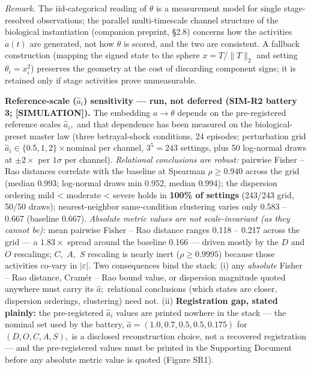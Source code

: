 \documentclass[11pt,twocolumn]{article}
\theoremstyle{gttdef}
\theoremstyle{gttplain}
\begin{document}
\emph{Remark.} The iid-categorical reading of $\theta$ is a measurement model for single stage-resolved observations; the parallel multi-timescale channel structure of the biological instantiation (companion preprint, \S{}2.8) concerns how the activities $a(t)$ are generated, not how $\theta$ is scored, and the two are consistent. A fallback construction (mapping the signed state to the sphere $x = T/\| T\|_{2}$ and setting $\theta_i = x_i^{2}$) preserves the geometry at the cost of discarding component signs; it is retained only if stage activities prove unmeasurable.

\textbf{Reference-scale ($\hat{a}_i$) sensitivity --- run, not deferred (SIM-R2 battery 3; [SIMULATION]).} The embedding $a \to \theta$ depends on the pre-registered reference scales $\hat{a}_i,$ and that dependence has been measured on the biological-preset master law (three betrayal-shock conditions, 24 episodes; perturbation grid $\hat{a}_i \in \{0.5, 1, 2\}\times$nominal per channel, $3^{5} = 243$ settings, plus 50 log-normal draws at $\pm 2\times$ per $1\sigma$ per channel). \emph{Relational conclusions are robust:} pairwise Fisher -- Rao distances correlate with the baseline at Spearman $\rho \geq 0.940$ across the grid (median 0.993; log-normal draws min 0.952, median 0.994); the dispersion ordering mild < moderate < severe holds in \textbf{100\% of settings} (243/243 grid, 50/50 draws); nearest-neighbor same-condition clustering varies only 0.583 -- 0.667 (baseline 0.667). \emph{Absolute metric values are not scale-invariant (as they cannot be):} mean pairwise Fisher -- Rao distance ranges 0.118 -- 0.217 across the grid --- a $1.83\times$ spread around the baseline 0.166 --- driven mostly by the $D$ and $O$ rescalings; $C,$ $A,$ $S$ rescaling is nearly inert ($\rho \geq 0.9995$) because those activities co-vary in $|\varepsilon|.$ Two consequences bind the stack: (i) any \emph{absolute} Fisher -- Rao distance, Cram\'er -- Rao bound value, or dispersion magnitude quoted anywhere must carry its $\hat{a};$ relational conclusions (which states are closer, dispersion orderings, clustering) need not. (ii) \textbf{Registration gap, stated plainly:} the pre-registered $\hat{a}_i$ values are printed nowhere in the stack --- the nominal set used by the battery, $\hat{a} = (1.0, 0.7, 0.5, 0.5, 0.175)$ for $(D, O, C, A, S),$ is a disclosed reconstruction choice, not a recovered registration --- and the pre-registered values must be printed in the Supporting Document before any absolute metric value is quoted (Figure SR1).
\end{document}

